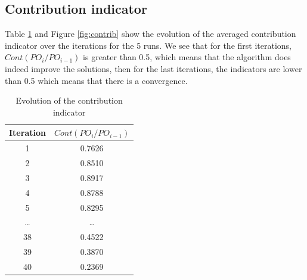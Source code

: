 \subsection{Contribution indicator}

Table \ref{tab:contrib} and Figure \ref{fig:contrib} show the evolution of the averaged contribution indicator over the iterations for the 5 runs. We see that for the first iterations, $Cont(PO_i/PO_{i-1})$ is greater than 0.5, which means that the algorithm does indeed improve the solutions, then for the last iterations, the indicators are lower than 0.5 which means that there is a convergence.

\begin{table}[h!]
\begin{center}
\begin{tabular}{|c|c|}
\hline Iteration & $Cont(PO_i/PO_{i-1})$ \\ 
\hline 1 & 0.7626 \\ 
\hline 2 & 0.8510 \\ 
\hline 3 & 0.8917 \\ 
\hline 4 & 0.8788 \\ 
\hline 5 & 0.8295 \\ 
\hline \dots & \dots \\
\hline 38 & 0.4522 \\
\hline 39 & 0.3870 \\ 
\hline 40 & 0.2369 \\
\hline 
\end{tabular} 
\end{center}
\caption{Evolution of the contribution indicator}
\label{tab:contrib}
\end{table}

